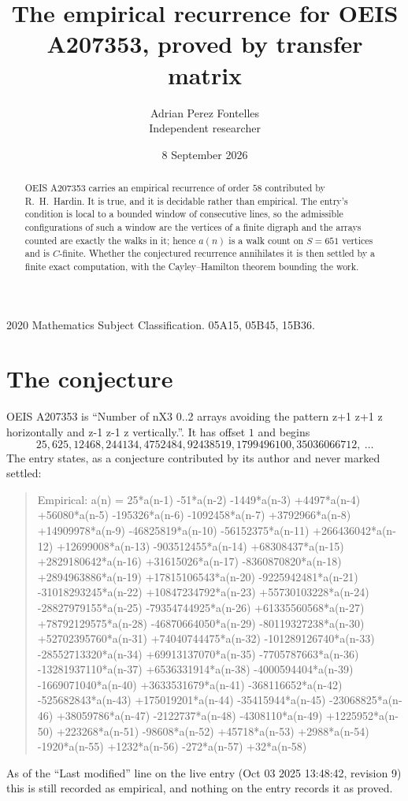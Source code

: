 \documentclass[11pt,a4paper]{article}
\title{The empirical recurrence for OEIS A207353, proved by transfer matrix}
\author{Adrian Perez Fontelles\\ \small Independent researcher}
\date{8 September 2026}
\theoremstyle{plain}
\theoremstyle{definition}
\begin{document}
\maketitle

\begin{abstract}
OEIS A207353 carries an empirical recurrence of order $58$ contributed by R.~H.~Hardin. It is
true, and it is decidable rather than empirical. The entry's condition is local to a bounded window of consecutive lines, so
the admissible configurations of such a window are the vertices of a finite digraph and the
arrays counted are exactly the walks in it; hence $a(n)$ is a walk count on $S=651$ vertices
and is $C$-finite. Whether the conjectured recurrence annihilates it is then settled by a
finite exact computation, with the Cayley--Hamilton theorem bounding the work.
\end{abstract}

\noindent\small 2020 Mathematics Subject Classification. 05A15, 05B45, 15B36.\normalsize

\section{The conjecture}

OEIS A207353 is ``Number of nX3 0..2 arrays avoiding the pattern z+1 z+1 z horizontally and z-1 z-1 z vertically.''. It has offset $1$ and begins
\[
25, 625, 12468, 244134, 4752484, 92438519, 1799496100, 35036066712,\ \dots
\]
The entry states, as a conjecture contributed by its author and never marked settled:
\begin{quote}
Empirical: a(n) = 25*a(n-1) -51*a(n-2) -1449*a(n-3) +4497*a(n-4) +56080*a(n-5) -195326*a(n-6) -1092458*a(n-7) +3792966*a(n-8) +14909978*a(n-9) -46825819*a(n-10) -56152375*a(n-11) +266436042*a(n-12) +12699008*a(n-13) -903512455*a(n-14) +68308437*a(n-15) +2829180642*a(n-16) +31615026*a(n-17) -8360870820*a(n-18) +2894963886*a(n-19) +17815106543*a(n-20) -9225942481*a(n-21) -31018293245*a(n-22) +10847234792*a(n-23) +55730103228*a(n-24) -28827979155*a(n-25) -79354744925*a(n-26) +61335560568*a(n-27) +78792129575*a(n-28) -46870664050*a(n-29) -80119327238*a(n-30) +52702395760*a(n-31) +74040744475*a(n-32) -101289126740*a(n-33) -28552713320*a(n-34) +69913137070*a(n-35) -7705787663*a(n-36) -13281937110*a(n-37) +6536331914*a(n-38) -4000594404*a(n-39) -1669071040*a(n-40) +3633531679*a(n-41) -368116652*a(n-42) -525682843*a(n-43) +175019201*a(n-44) -35415944*a(n-45) -23068825*a(n-46) +38059786*a(n-47) -2122737*a(n-48) -4308110*a(n-49) +1225952*a(n-50) +223268*a(n-51) -98608*a(n-52) +45718*a(n-53) +2988*a(n-54) -1920*a(n-55) +1232*a(n-56) -272*a(n-57) +32*a(n-58)
\end{quote}
As of the ``Last modified'' line on the live entry (Oct 03 2025 13:48:42, revision 9) this is still
recorded as empirical, and nothing on the entry records it as proved.
\end{document}
